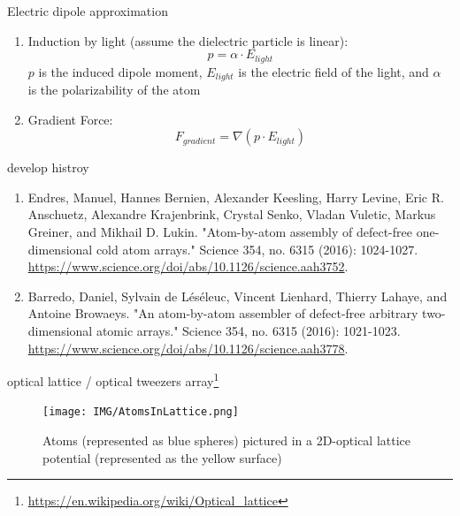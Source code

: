 \documentclass[18 pt]{beamer}
\begin{document}
\begin{frame}{Electric dipole approximation}
  \begin{enumerate}
    \item Induction by light (assume the dielectric particle is linear):
    \[p = \alpha \cdot E_{light}\]
    $p$ is the induced dipole moment, $E_{light}$ is the electric field of the light, and \(\alpha\) is the polarizability of the atom
    \item Gradient Force:
    \[F_{gradient} = \nabla (p \cdot E_{light})\]
  \end{enumerate}
\end{frame}
\begin{frame}{develop histroy}
  \begin{enumerate}
    \item \small{Endres, Manuel, Hannes Bernien, Alexander Keesling, Harry Levine, Eric R. Anschuetz, Alexandre Krajenbrink, Crystal Senko, Vladan Vuletic, Markus Greiner, and Mikhail D. Lukin. "Atom-by-atom assembly of defect-free one-dimensional cold atom arrays." Science 354, no. 6315 (2016): 1024-1027. \url{https://www.science.org/doi/abs/10.1126/science.aah3752}.}
    \item \small{Barredo, Daniel, Sylvain de Léséleuc, Vincent Lienhard, Thierry Lahaye, and Antoine Browaeys. "An atom-by-atom assembler of defect-free arbitrary two-dimensional atomic arrays." Science 354, no. 6315 (2016): 1021-1023. \url{https://www.science.org/doi/abs/10.1126/science.aah3778}.}
  \end{enumerate}
\end{frame}
\begin{frame}{optical lattice / optical tweezers array\footnote{\url{https://en.wikipedia.org/wiki/Optical_lattice}}}
  \begin{figure}
    \texttt{[image: IMG/AtomsInLattice.png]}
    \caption{Atoms (represented as blue spheres) pictured in a 2D-optical lattice potential (represented as the yellow surface)}
  \end{figure}
\end{frame}
\end{document}
